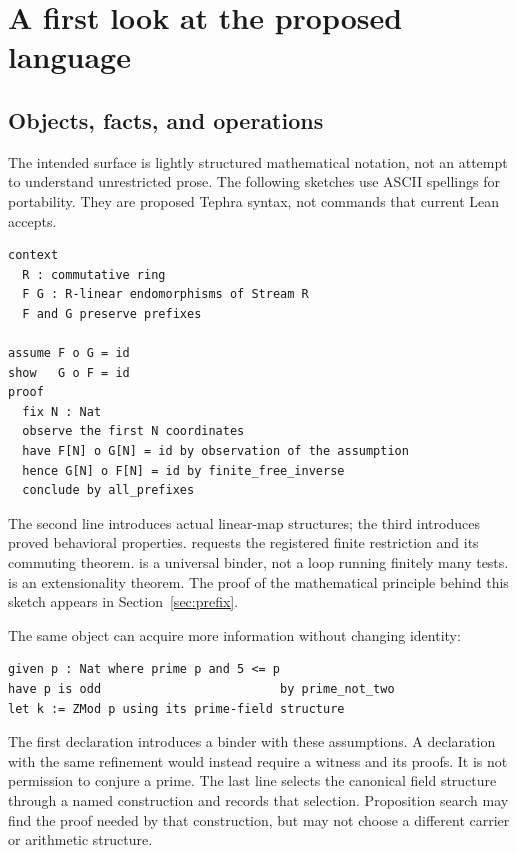 \documentclass[11pt,a4paper]{article}
\newcommand{\code}[1]{\texttt{\detokenize{#1}}}
\theoremstyle{plain}
\theoremstyle{definition}
\begin{document}
\section{A first look at the proposed language}\label{sec:surface}

\subsection{Objects, facts, and operations}
The intended surface is lightly structured mathematical notation, not an attempt to understand unrestricted prose. The following sketches use ASCII spellings for portability. They are proposed Tephra syntax, not commands that current Lean accepts.

\par\noindent\begin{minipage}{\linewidth}
\begin{lstlisting}
context
  R : commutative ring
  F G : R-linear endomorphisms of Stream R
  F and G preserve prefixes

assume F o G = id
show   G o F = id
proof
  fix N : Nat
  observe the first N coordinates
  have F[N] o G[N] = id by observation of the assumption
  hence G[N] o F[N] = id by finite_free_inverse
  conclude by all_prefixes
\end{lstlisting}
\end{minipage}\par

The second line introduces actual linear-map structures; the third introduces proved behavioral properties. \code{observe} requests the registered finite restriction and its commuting theorem. \code{fix N} is a universal binder, not a loop running finitely many tests. \code{all_prefixes} is an extensionality theorem. The proof of the mathematical principle behind this sketch appears in Section~\ref{sec:prefix}.

The same object can acquire more information without changing identity:
\par\noindent\begin{minipage}{\linewidth}
\begin{lstlisting}
given p : Nat where prime p and 5 <= p
have p is odd                         by prime_not_two
let k := ZMod p using its prime-field structure
\end{lstlisting}
\end{minipage}\par
The first declaration introduces a binder with these assumptions. A \code{construct} declaration with the same refinement would instead require a witness and its proofs. It is not permission to conjure a prime. The last line selects the canonical field structure through a named construction and records that selection. Proposition search may find the proof needed by that construction, but may not choose a different carrier or arithmetic structure.
\end{document}
